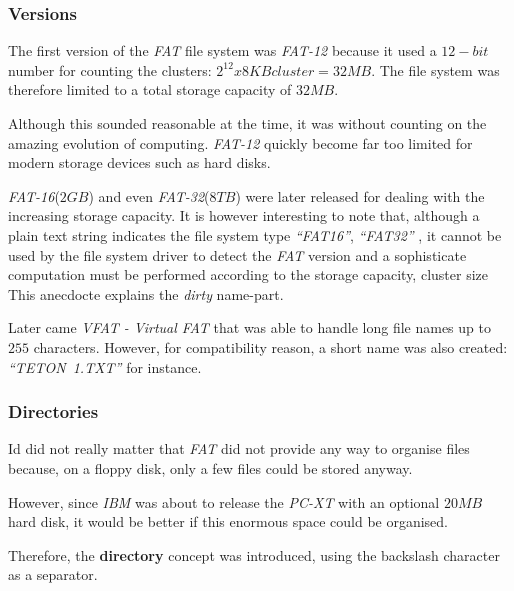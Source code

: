 
\begin{frame}
  \frametitle{Versions}

  The first version of the \textit{FAT} file system was \textit{FAT-12}
  because it used a $12-bit$ number for counting the clusters: $2^{12} x
  8KB cluster = 32MB$. The file system was therefore limited to a total
  storage capacity of $32MB$.

  \-

  Although this sounded reasonable at the time, it was without counting on
  the amazing evolution of computing. \textit{FAT-12} quickly become
  far too limited for modern storage devices such as hard disks.

  \-

  \textit{FAT-16}($2 GB$) and even \textit{FAT-32}($8 TB$) were later released
  for dealing with the increasing storage capacity. It is however interesting
  to note that, although a plain text string indicates the file system type
  \textit{``FAT16''}, \textit{``FAT32''} \etc{}, it cannot be used by
  the file system driver to detect the \textit{FAT} version and a sophisticate
  computation must be performed according to the storage capacity, cluster
  size \etc{} This anecdocte explains the \textit{dirty} name-part.

  \-

  Later came \textit{VFAT - Virtual FAT} that was able to handle long
  file names up to $255$ characters. However, for compatibility reason, a
  short name was also created: \textit{``TETON~1.TXT''} for instance.
\end{frame}


\begin{frame}
  \frametitle{Directories}

  Id did not really matter that \textit{FAT} did not provide any way to
  organise files because, on a floppy disk, only a few files could be stored
  anyway.

  \-

  However, since \textit{IBM} was about to release the \textit{PC-XT} with
  an optional $20 MB$ hard disk, it would be better if this enormous space
  could be organised.

  \-

  Therefore, the \textbf{directory} concept was introduced, using the
  backslash character as a separator.
\end{frame}


